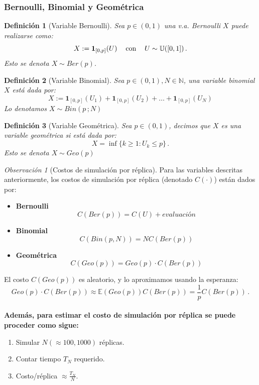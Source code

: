 \documentclass[letterpaper,11pt]{article} %
\def\espacio{\hspace{.25cm}\,}
\theoremstyle{defbreak}
\newtheorem{definition}{Definición}[subsection]
\theoremstyle{propbreak}
\theoremstyle{remark}
\newtheorem{remark}{Observación}[subsection]
\theoremstyle{break}
\def\E{\mathbb{E}}
\def\N{\mathbb{N}}
\def\unif{\mathbb{U}([0,1])}
\begin{document}
\subsubsection{Bernoulli, Binomial y Geométrica}
\begin{definition}[Variable Bernoulli]
Sea $p\in(0,1)$ una v.a. Bernoulli $X$ puede realizarse como:
$$ X:=\mathbf{1}_{[0,p]}(U) \espacio \mbox{ con } \espacio U\sim\unif \, .$$
Esto se denota $ X\sim Ber(p)$.
\end{definition}
\begin{definition}[Variable Binomial]
Sea $p\in(0,1),N\in\N$, una variable binomial $X$ está dada por:
$$ X:=\mathbf{1}_{[0,p]}(U_1)+\mathbf{1}_{[0,p]}(U_2)+\dots+\mathbf{1}_{[0,p]}(U_N)$$
Lo denotamos $X\sim Bin(p\,;N)$
\end{definition}
\begin{definition}[Variable Geométrica]
Sea $p\in(0,1)$, decimos que $X$ es una variable geométrica si está dada por:
$$ X=\inf\{k\geq1:U_k\leq p\} \, .$$
Esto se denota $X\sim Geo(p)$
\end{definition}
\begin{remark}[Costos de simulación por réplica]
Para las variables descritas anteriormente, los costos de simulación por réplica (denotado $C(\cdot)$) están dados por:
\begin{itemize}
    \item \textbf{Bernoulli}
    $$ C(Ber(p)) = C(U) + evaluación $$
    \item \textbf{Binomial}
    $$ C(Bin(p,N)) = N C(Ber(p))$$
    \item \textbf{Geométrica}
    $$ C(Geo(p)) = Geo(p)\cdot C(Ber(p))$$
\end{itemize}
El costo $C(Geo(p))$ es aleatorio, y lo aproximamos usando la esperanza:
$$ Geo(p)\cdot C(Ber(p))\approx \E(Geo(p))C(Ber(p))=\displaystyle\frac{1}{p}C(Ber(p)) \, .$$
\\ \textbf{Además, para estimar el costo de simulación por réplica se puede proceder como sigue:}
\begin{enumerate}
    \item Simular $N(\approx100,1000)$ réplicas.
    \item Contar tiempo $T_N$ requerido.
    \item Costo/réplica $\approx \displaystyle\frac{T_N}{N}$.
\end{enumerate}
\end{remark}
\end{document}
